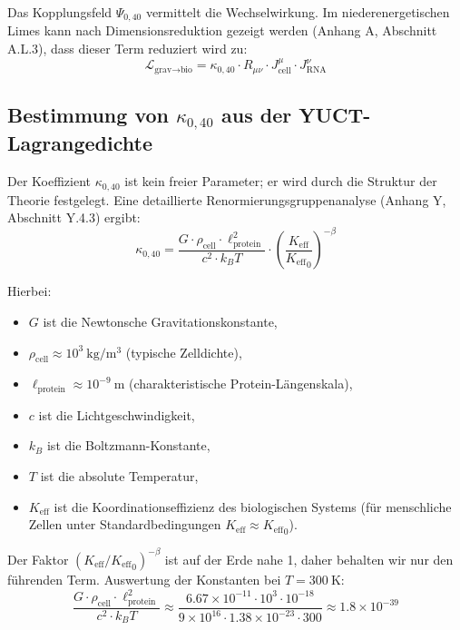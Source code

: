 \documentclass[12pt,a4paper]{article}
\theoremstyle{remark}
\newcommand{\Keff}{K_{\mathrm{eff}}}
\begin{document}
	Das Kopplungsfeld \(\Psi_{0,40}\) vermittelt die Wechselwirkung. Im niederenergetischen Limes kann nach Dimensionsreduktion gezeigt werden (Anhang A, Abschnitt A.L.3), dass dieser Term reduziert wird zu:
	\begin{equation}
		\mathcal{L}_{\text{grav}\to\text{bio}} = \kappa_{0,40} \cdot R_{\mu\nu} \cdot J_{\text{cell}}^\mu \cdot J_{\text{RNA}}^\nu
		\label{eq:coupling-raw}
	\end{equation}
	
	\subsection{Bestimmung von \(\kappa_{0,40}\) aus der YUCT-Lagrangedichte}
	
	Der Koeffizient \(\kappa_{0,40}\) ist kein freier Parameter; er wird durch die Struktur der Theorie festgelegt. Eine detaillierte Renormierungsgruppenanalyse (Anhang Y, Abschnitt Y.4.3) ergibt:
	\begin{equation}
		\kappa_{0,40} = \frac{G \cdot \rho_{\text{cell}} \cdot \ell_{\text{protein}}^2}{c^2 \cdot k_B T} \cdot \left( \frac{\Keff}{{\Keff}_0} \right)^{-\beta}
		\label{eq:kappa-exact}
	\end{equation}
	
	Hierbei:
	\begin{itemize}
		\item \(G\) ist die Newtonsche Gravitationskonstante,
		\item \(\rho_{\text{cell}} \approx 10^3\ \mathrm{kg/m^3}\) (typische Zelldichte),
		\item \(\ell_{\text{protein}} \approx 10^{-9}\ \mathrm{m}\) (charakteristische Protein-Längenskala),
		\item \(c\) ist die Lichtgeschwindigkeit,
		\item \(k_B\) ist die Boltzmann-Konstante,
		\item \(T\) ist die absolute Temperatur,
		\item \(\Keff\) ist die Koordinationseffizienz des biologischen Systems (für menschliche Zellen unter Standardbedingungen \(\Keff \approx {\Keff}_0\)).
	\end{itemize}
	
	Der Faktor \((\Keff/{\Keff}_0)^{-\beta}\) ist auf der Erde nahe 1, daher behalten wir nur den führenden Term. Auswertung der Konstanten bei \(T = 300\ \mathrm{K}\):
	\[
	\frac{G \cdot \rho_{\text{cell}} \cdot \ell_{\text{protein}}^2}{c^2 \cdot k_B T} \approx \frac{6.67\times 10^{-11} \cdot 10^3 \cdot 10^{-18}}{9\times 10^{16} \cdot 1.38\times 10^{-23} \cdot 300} \approx 1.8 \times 10^{-39}
	\]
	
\end{document}
